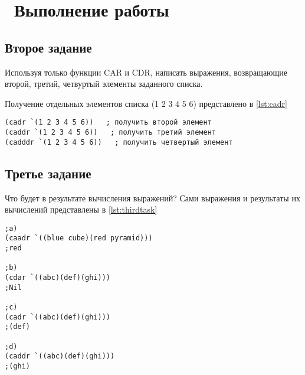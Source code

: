 \chapter{ Выполнение работы}
\label{cha:analysis}

\section{ Второе задание}
Используя только функции CAR и CDR, написать выражения, возвращающие второй, третий, четвуртый элементы заданного списка.

Получение отдельных элементов списка (1 2 3 4 5 6) представлено в \ref{lst:cadr}
\begin{lstlisting}[style=lispStyle, caption={Получение элементов списка с помощью команд car и cdr.},
                    label={lst:cadr}]
(cadr `(1 2 3 4 5 6))   ; получить второй элемент
(caddr `(1 2 3 4 5 6))   ; получить третий элемент
(cadddr `(1 2 3 4 5 6))   ; получить четвертый элемент
\end{lstlisting}

\section{ Третье задание}
Что будет в результате вычисления выражений?
Сами выражения и результаты их вычислений представлены в \ref{lst:thirdtask}
\begin{lstlisting}[style=lispStyle, caption={Получение элементов списка с помощью команд car и cdr.},
                    label={lst:thirdtask}]
;a)
(caadr `((blue cube)(red pyramid)))
;red

;b)
(cdar `((abc)(def)(ghi)))
;Nil

;c)
(cadr `((abc)(def)(ghi)))
;(def)

;d)
(caddr `((abc)(def)(ghi)))
;(ghi)
\end{lstlisting}
